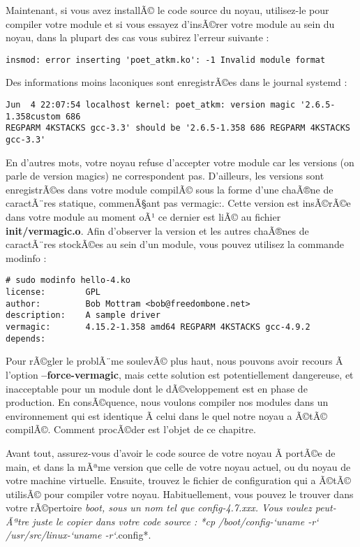 \documentclass[11pt]{article}
\begin{document}
Maintenant, si vous avez installÃ© le code source du noyau, utilisez-le pour compiler votre module et si vous essayez d'insÃ©rer votre module au sein du noyau, dans la plupart des cas vous subirez l'erreur suivante :

\begin{verbatim}
insmod: error inserting 'poet_atkm.ko': -1 Invalid module format
\end{verbatim}

Des informations moins laconiques sont enregistrÃ©es dans le journal systemd :

\begin{verbatim}
Jun  4 22:07:54 localhost kernel: poet_atkm: version magic '2.6.5-1.358custom 686
REGPARM 4KSTACKS gcc-3.3' should be '2.6.5-1.358 686 REGPARM 4KSTACKS gcc-3.3'
\end{verbatim}

En d'autres mots, votre noyau refuse d'accepter votre module car les versions (on parle de version magics) ne correspondent pas. D'ailleurs, les versions sont enregistrÃ©es dans votre module compilÃ© sous la forme d'une chaÃ®ne de caractÃ¨res statique, commenÃ§ant pas vermagic:. Cette version est insÃ©rÃ©e dans votre module au moment oÃ¹ ce dernier est liÃ© au fichier \textbf{init/vermagic.o}. Afin d'observer la version et les autres chaÃ®nes de caractÃ¨res stockÃ©es au sein d'un module, vous pouvez utilisez la commande modinfo :

\begin{verbatim}
# sudo modinfo hello-4.ko
license:        GPL
author:         Bob Mottram <bob@freedombone.net>
description:    A sample driver
vermagic:       4.15.2-1.358 amd64 REGPARM 4KSTACKS gcc-4.9.2
depends:
\end{verbatim}

Pour rÃ©gler le problÃ¨me soulevÃ© plus haut, nous pouvons avoir recours Ã  l'option \textbf{--force-vermagic}, mais cette solution est potentiellement dangereuse, et inacceptable pour un module dont le dÃ©veloppement est en phase de production. En consÃ©quence, nous voulons compiler nos modules dans un environnement qui est identique Ã  celui dans le quel notre noyau a Ã©tÃ© compilÃ©. Comment procÃ©der est l'objet de ce chapitre.

Avant tout, assurez-vous d'avoir le code source de votre noyau Ã  portÃ©e de main, et dans la mÃªme version que celle de votre noyau actuel, ou du noyau de votre machine virtuelle. Ensuite, trouvez le fichier de configuration qui a Ã©tÃ© utilisÃ© pour compiler votre noyau. Habituellement, vous pouvez le trouver dans votre rÃ©pertoire \emph{boot, sous un nom tel que config-4.7.xxx. Vous voulez peut-Ãªtre juste le copier dans votre code source : *cp /boot/config-`uname -r` /usr/src/linux-`uname -r`}.config*.
\end{document}
